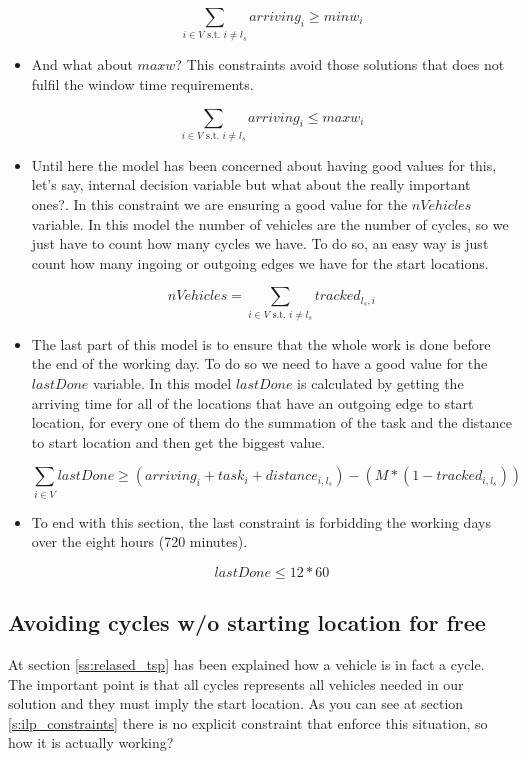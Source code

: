 \documentclass[]{report}
\begin{document}
\begin{itemize}
	$$\sum\limits_{i \in V \text{ s.t. } i \neq l_{s}} arriving_{i} \geq minw_{i}$$
	
	\item And what about $maxw$? This constraints avoid those solutions that does not fulfil the window time requirements.
	
	$$\sum\limits_{i \in V \text{ s.t. } i \neq l_{s}} arriving_{i} \leq maxw_{i}$$
	
	\item Until here the model has been concerned about having good values for this, let's say, internal decision variable but what about the really important ones?. In this constraint we are ensuring a good value for the $nVehicles$ variable. In this model the number of vehicles are the number of cycles, so we just have to count how many cycles we have. To do so, an easy way is just count how many ingoing or outgoing edges we have for the start locations.
	
	$$nVehicles = \sum\limits_{i \in V \text{ s.t. } i \neq l_{s}} tracked_{l_{s}, i}$$
	
	\item The last part of this model is to ensure that the whole work is done before the end of the working day. To do so we need to have a good value for the $lastDone$ variable. In this model $lastDone$ is calculated by getting the arriving time for all of the locations that have an outgoing edge to start location, for every one of them do the summation of the task and the distance to start location and then get the biggest value.
	
	$$ \sum\limits_{i \in V} lastDone \geq (arriving_i + task_i + distance_{i, l_{s}}) - (M*(1-tracked_{i, l_{s}}))$$
	
	\item To end with this section, the last constraint is forbidding the working days over the eight hours (720 minutes).
	
	$$ lastDone \leq 12*60$$


\end{itemize}

\subsection{Avoiding cycles w/o starting location for free}\label{ss:arriving_time_0_implications}

At section \ref{ss:relased_tsp} has been explained how a vehicle is in fact a cycle. The important point is that all cycles represents all vehicles needed in our solution and they must imply the start location. As you can see at section \ref{s:ilp_constraints} there is no explicit constraint that enforce this situation, so how it is actually  working?
\end{document}
